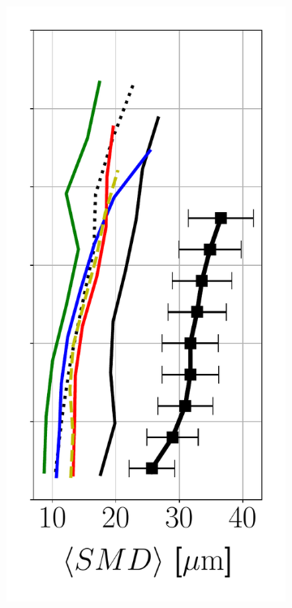 \begin{figure}[h!]
\begin{subfigure}[b]{0.2\textwidth}
\end{subfigure}
\hspace*{0.5in}
\begin{subfigure}[b]{0.2\textwidth}
	\flushleft
   \includegraphics[scale=0.35]{./part2_developments/figures_ch6_lagrangian_JICF/params_gaseous_initial_conditions/profiles/SMD_along_z}

\end{subfigure}
\end{figure}
